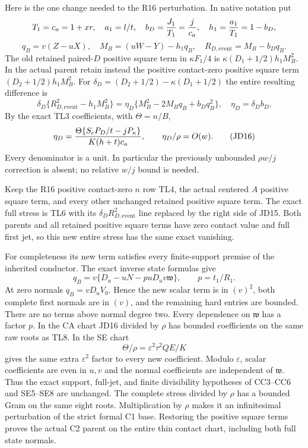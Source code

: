 Here is the one change needed to the R16 perturbation.  In native
notation put
\[
 T_1=c_a=1+xr,\quad a_1=l/t,\quad
 b_D={J_1\over T_1}={j\over c_a},\quad
 h_1={a_1\over T_1}=1-b_D,
\]
\[
 q_B=v(Z-uX),\quad M_B=(uW-Y)-h_1q_B,
 \quad R_{D,\mathrm{event}}=M_B-b_Dq_B.               \tag{JD14}
\]
The old retained paired-$D$ positive square term in $\kappa F_1/4$ is
$\kappa(D_1+1/2)h_1M_B^2$.  In the actual parent retain instead
the positive contact-zero positive square term $(D_2+1/2)h_1M_B^2$.
For $\delta_D=(D_2+1/2)-\kappa(D_1+1/2)$ the entire resulting
difference is
\[
 \boxed{\quad
 \delta_D\{R_{D,\mathrm{event}}^2-h_1M_B^2\}
 =\eta_D\{M_B^2-2M_Bq_B+b_Dq_B^2\},\quad
 \eta_D=\delta_D b_D.\quad}                          \tag{JD15}
\]
By the exact TL3 coefficients, with $\Theta=n/B$,
\[
 \eta_D={\Theta\{S_cP_D/t-jP_\kappa\}
                    \over K(h+t)c_a},\qquad
       \eta_D/\rho=O(w).                            \tag{JD16}
\]
Every denominator is a unit.  In particular the previously unbounded
$\rho w/j$ correction is absent; no relative $w/j$ bound is needed.

Keep the R16 positive contact-zero $n$ row TL4, the actual centered
$A$ positive square term, and every other unchanged retained positive square term.  The exact
full stress is TL6 with its $\delta_D R_{D,\mathrm{event}}^2$
line replaced by the right side of JD15.  Both parents and all
retained positive square terms have zero contact value and full first jet, so this
new entire stress has the same exact vanishing.

For completeness its new term satisfies every finite-support premise
of the inherited conductor.  The exact inverse state formulas give
\[
 q_B=v\{D_u-uN-puD_uv\mathfrak w\},\qquad p=t_1/R_1.
                                                               \tag{JD17}
\]
At zero normals $q_B=vD_uV_0$.  Hence the new scalar term is in
$(v)^2$, both complete first normals are in $(v)$, and the remaining
hard entries are bounded.  There are no terms above normal degree
two.  Every dependence on $\mathfrak w$ has a factor $p$.
In the CA chart JD16 divided by $\rho$ has bounded coefficients
on the same raw roots as TL8.  In the SE chart
\[
 \Theta/\rho=\varepsilon^2\tau^2QE/K
\]
gives the same extra $\varepsilon^2$ factor to every new coefficient.
Modulo $\varepsilon$, scalar coefficients are even in $u,v$ and
the normal coefficients are independent of $\mathfrak w$.
Thus the exact support, full-jet, and finite divisibility hypotheses
of CC3--CC6 and SE5--SE8 are unchanged.  The complete stress divided
by $\rho$ has a bounded Gram on the same eight roots.  Multiplication
by $\rho$ makes it an infinitesimal perturbation of the strict formal
C1 base.  Restoring the positive square terms proves the actual C2 parent
on the entire thin contact chart, including both full state normals.

